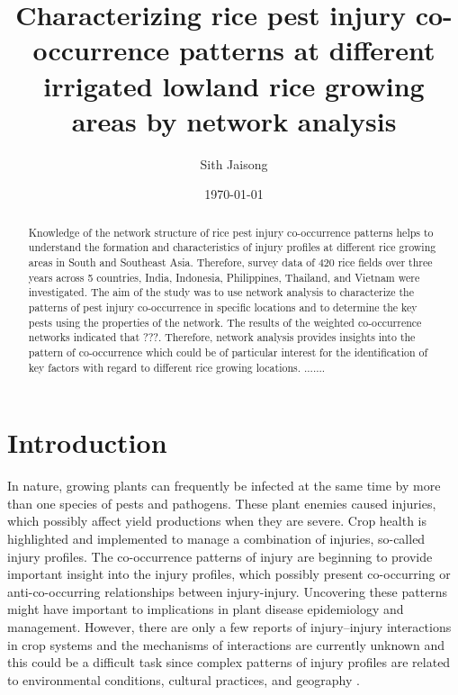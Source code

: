\documentclass[a4paper]{article}
\title{Characterizing rice pest injury co-occurrence patterns at different irrigated lowland rice growing areas by network analysis}
\author{Sith Jaisong}
\date{\today}
\begin{document}
\maketitle

\begin{abstract}

Knowledge of the network structure of rice pest injury co-occurrence patterns helps to understand the formation and characteristics of injury profiles at different rice growing areas in South and Southeast Asia. Therefore, survey data of 420 rice fields over three years across 5 countries, India, Indonesia, Philippines, Thailand, and Vietnam were investigated. The aim of the study was to use network analysis to characterize the patterns of pest injury co-occurrence in specific locations and to determine the key pests using the properties of the network. The results of the weighted co-occurrence networks indicated that ???. Therefore, network analysis provides insights into the pattern of co-occurrence  which could be of particular interest for the identification of key factors with regard to different rice growing locations. .......

\end{abstract}

\section*{Introduction}
In nature, growing plants can frequently be infected at the same time by more than one species of pests and pathogens. These plant enemies caused injuries, which possibly affect yield productions when they are severe. Crop health is highlighted and implemented to manage a combination of injuries, so-called injury profiles. The co-occurrence patterns of injury are beginning to provide important insight into the injury profiles, which possibly present co-occurring or anti-co-occurring relationships between injury-injury. Uncovering these patterns might have important to implications in plant disease epidemiology and management. However, there are only a few reports of injury–injury interactions in crop systems and the mechanisms of interactions are currently unknown and this could be a difficult task since complex patterns of injury profiles are related to environmental conditions, cultural practices, and geography \citep{willocquet2004research}.
\end{document}
